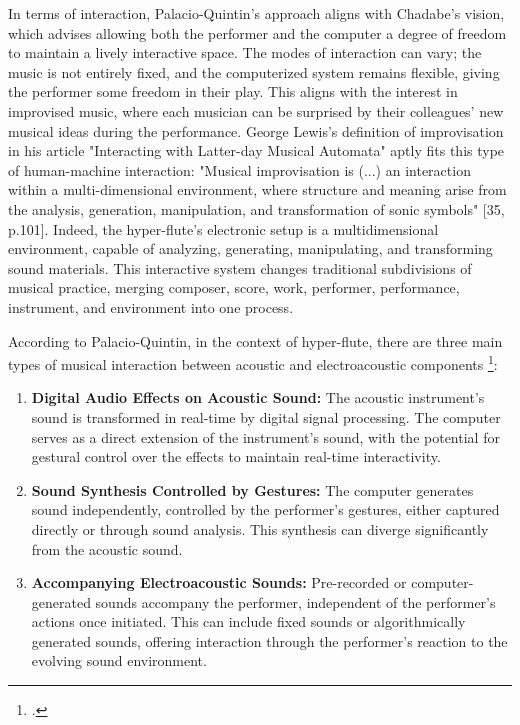 \documentclass[12pt,twoside,maitrise]{dms_ks}
\theoremstyle{definition}
\begin{document}
In terms of interaction, Palacio-Quintin’s approach aligns with Chadabe's vision, which advises allowing both the performer and the computer a degree of freedom to maintain a lively interactive space. 
The modes of interaction can vary; the music is not entirely fixed, and the computerized system remains flexible, giving the performer some freedom in their play. 
This aligns with the interest in improvised music, where each musician can be surprised by their colleagues' new musical ideas during the performance. 
George Lewis’s definition of improvisation in his article "Interacting with Latter-day Musical Automata" aptly fits this type of human-machine interaction: "Musical improvisation is (...) an interaction within a multi-dimensional environment, where structure and meaning arise from the analysis, generation, manipulation, and transformation of sonic symbols" [35, p.101]. 
Indeed, the hyper-flute’s electronic setup is a multidimensional environment, capable of analyzing, generating, manipulating, and transforming sound materials. 
This interactive system changes traditional subdivisions of musical practice, merging composer, score, work, performer, performance, instrument, and environment into one process.

According to Palacio-Quintin, in the context of hyper-flute, there are three main types of musical interaction between acoustic and electroacoustic components \footcite[52]{palacio-quintin_composition_2012-1}:

\begin{enumerate}
  \item \textbf{Digital Audio Effects on Acoustic Sound:} The acoustic instrument's sound is transformed in real-time by digital signal processing. 
The computer serves as a direct extension of the instrument's sound, with the potential for gestural control over the effects to maintain real-time interactivity.
  
  \item \textbf{Sound Synthesis Controlled by Gestures:} The computer generates sound independently, controlled by the performer's gestures, either captured directly or through sound analysis. 
This synthesis can diverge significantly from the acoustic sound.
  
  \item \textbf{Accompanying Electroacoustic Sounds:} Pre-recorded or computer-generated sounds accompany the performer, independent of the performer's actions once initiated. 
This can include fixed sounds or algorithmically generated sounds, offering interaction through the performer's reaction to the evolving sound environment.
\end{enumerate}
\end{document}
